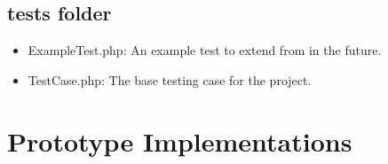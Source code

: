 \documentclass[11pt]{report}
\begin{document}

\subsection{tests folder}
\begin{itemize}
    \item ExampleTest.php: An example test to extend from in the future.
    \item TestCase.php: The base testing case for the project.
\end{itemize}
    


    
    \section{Prototype Implementations}
\end{document}

